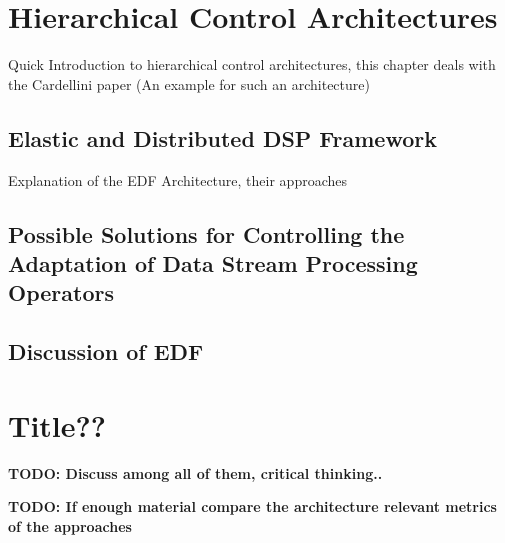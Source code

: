     \section{Hierarchical Control Architectures}
    Quick Introduction to hierarchical control architectures, this chapter deals with the Cardellini
    paper (An example for such an architecture)

        \subsection{Elastic and Distributed DSP Framework}
        Explanation of the EDF Architecture, their approaches

        \subsection{Possible Solutions for Controlling the Adaptation of Data Stream Processing Operators}

        \subsection{Discussion of EDF}

    \section{Title??}
    \textbf{TODO: Discuss among all of them, critical thinking..}

    \textbf{TODO: If enough material compare the architecture relevant metrics of the approaches}
